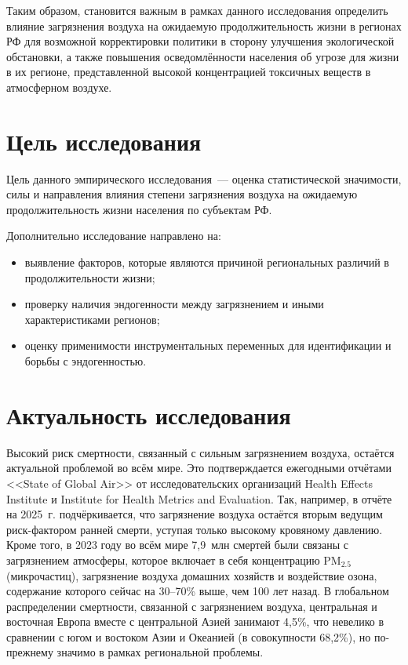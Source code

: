 \documentclass[11pt,a4paper]{article}
\begin{document}
\medskip

Таким образом, становится важным в рамках данного исследования определить влияние загрязнения воздуха на ожидаемую продолжительность жизни в регионах РФ для возможной корректировки политики в сторону улучшения экологической обстановки, а также повышения осведомлённости населения об угрозе для жизни в их регионе, представленной высокой концентрацией токсичных веществ в атмосферном воздухе.

\section*{Цель исследования}

Цель данного эмпирического исследования~--- оценка статистической значимости, силы и направления влияния степени загрязнения воздуха на ожидаемую продолжительность жизни населения по субъектам РФ.

Дополнительно исследование направлено на:
\begin{itemize}
  \item выявление факторов, которые являются причиной региональных различий в продолжительности жизни;
  \item проверку наличия эндогенности между загрязнением и иными характеристиками регионов;
  \item оценку применимости инструментальных переменных для идентификации и борьбы с эндогенностью.
\end{itemize}

\section*{Актуальность исследования}

Высокий риск смертности, связанный с сильным загрязнением воздуха, остаётся актуальной проблемой во всём мире. Это подтверждается ежегодными отчётами <<State of Global Air>> от исследовательских организаций Health Effects Institute и Institute for Health Metrics and Evaluation. Так, например, в отчёте на 2025~г. подчёркивается, что загрязнение воздуха остаётся вторым ведущим риск-фактором ранней смерти, уступая только высокому кровяному давлению. Кроме того, в 2023 году во всём мире 7{,}9~млн смертей были связаны с загрязнением атмосферы, которое включает в себя концентрацию $\text{PM}_{2.5}$ (микрочастиц), загрязнение воздуха домашних хозяйств и воздействие озона, содержание которого сейчас на 30--70\% выше, чем 100 лет назад. В глобальном распределении смертности, связанной с загрязнением воздуха, центральная и восточная Европа вместе с центральной Азией занимают 4{,}5\%, что невелико в сравнении с югом и востоком Азии и Океанией (в совокупности 68{,}2\%), но по-прежнему значимо в рамках региональной проблемы.
\end{document}
